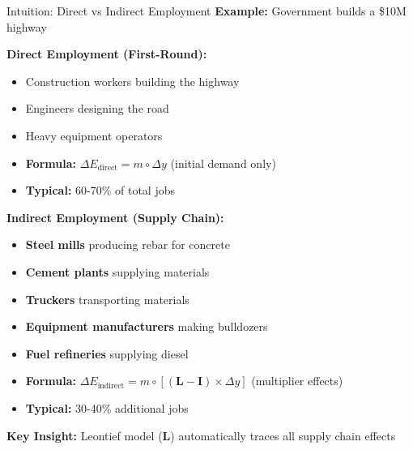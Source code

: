 \documentclass[10pt]{beamer}
\begin{document}
\begin{frame}{Intuition: Direct vs Indirect Employment}
\textbf{Example:} Government builds a \$10M highway

\vspace{0.3cm}

\textbf{Direct Employment (First-Round):}
\begin{itemize}
    \item Construction workers building the highway
    \item Engineers designing the road
    \item Heavy equipment operators
    \item \textbf{Formula:} $\Delta E_{\text{direct}} = m \circ \Delta y$ (initial demand only)
    \item \textbf{Typical:} 60-70\% of total jobs
\end{itemize}

\vspace{0.4cm}

\textbf{Indirect Employment (Supply Chain):}
\begin{itemize}
    \item \textbf{Steel mills} producing rebar for concrete
    \item \textbf{Cement plants} supplying materials
    \item \textbf{Truckers} transporting materials
    \item \textbf{Equipment manufacturers} making bulldozers
    \item \textbf{Fuel refineries} supplying diesel
    \item \textbf{Formula:} $\Delta E_{\text{indirect}} = m \circ [(\mathbf{L} - \mathbf{I}) \times \Delta y]$ (multiplier effects)
    \item \textbf{Typical:} 30-40\% additional jobs
\end{itemize}

\vspace{0.3cm}

\textbf{Key Insight:} Leontief model ($\mathbf{L}$) automatically traces all supply chain effects

\end{frame}
\end{document}
